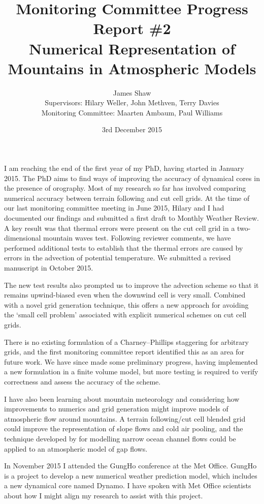 \documentclass[a4paper]{article}
\title{Monitoring Committee Progress Report \#2\\
\vspace*{1em}
\Large{Numerical Representation of Mountains in Atmospheric Models}}
\author{James Shaw
\vspace{0.5em} \\
\large{Supervisors: Hilary Weller, John Methven, Terry Davies}
\vspace{0.5em} \\
\large{Monitoring Committee: Maarten Ambaum, Paul Williams}}
\date{3rd December 2015}
\begin{document}
\newcommand{\exner}{\Pi}
\newcommand{\TODO}[1]{\textcolor{purple}{TODO: \emph{#1}}}
\maketitle


I am reaching the end of the first year of my PhD, having started in January 2015.
The PhD aims to find ways of improving the accuracy of dynamical cores in the presence of orography.
Most of my research so far has involved comparing numerical accuracy between terrain following and cut cell grids.
At the time of our last monitoring committee meeting in June 2015, Hilary and I had documented our findings and submitted a first draft to Monthly Weather Review.  A key result was that thermal errors were present on the cut cell grid in a two-dimensional mountain waves test.  Following reviewer comments, we have performed additional tests to establish that the thermal errors are caused by errors in the advection of potential temperature.  We submitted a revised manuscript in October 2015.

The new test results also prompted us to improve the advection scheme so that it remains upwind-biased even when the downwind cell is very small.  Combined with a novel grid generation technique, this offers a new approach for avoiding the `small cell problem' associated with explicit numerical schemes on cut cell grids.

There is no existing formulation of a Charney--Phillips staggering for arbitrary grids, and the first monitoring committee report identified this as an area for future work.  We have since made some preliminary progress, having implemented a new formulation in a finite volume model, but more testing is required to verify correctness and assess the accuracy of the scheme.

I have also been learning about mountain meteorology and considering how improvements to numerics and grid generation might improve models of atmospheric flow around mountains.  A terrain following/cut cell blended grid could improve the representation of slope flows and cold air pooling, and the technique developed by \citet{adcroft2013} for modelling narrow ocean channel flows could be applied to an atmospheric model of gap flows.

In November 2015 I attended the GungHo conference at the Met Office.  GungHo is a project to develop a new numerical weather prediction model, which includes a new dynamical core named Dynamo.  I have spoken with Met Office scientists about how I might align my research to assist with this project.
\end{document}
